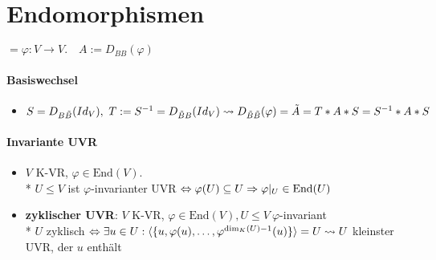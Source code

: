 \section{\label{sec:Endomorphismen}Endomorphismen}

$= \varphi: V \rightarrow V.\quad A:=D_{BB}(\varphi)$

\paragraph{Basiswechsel}
\begin{itemize}
	\item $S=D_{B\tilde{B}}(Id_V), \ T:=S^{-1}=D_{\tilde{B}B}(Id_V) \\* \leadsto D_{\tilde{B}\tilde{B}}(\varphi)=\tilde{A}=T*A*S=S^{-1}*A*S$
\end{itemize}

\paragraph{Invariante UVR}
\begin{itemize}
	\item $V$ K-VR, $\varphi \in \text{End}(V)$. \\* $U \leq V$ ist $\varphi$-invarianter UVR $\Leftrightarrow \varphi(U) \subseteq U \\* \Rightarrow \varphi|_U \in \text{End}(U)$
	\item \textbf{zyklischer UVR}: $V$ K-VR, $\varphi \in \text{End}(V), U \leq V \ \varphi$-invariant \\* $U$ zyklisch $\Leftrightarrow \exists u \in U: \langle \{ u, \varphi(u),\dots,\varphi^{\text{dim}_K(U)-1}(u) \} \rangle = U \\* \leadsto U$ kleinster UVR, der $u$ enthält
\end{itemize}

